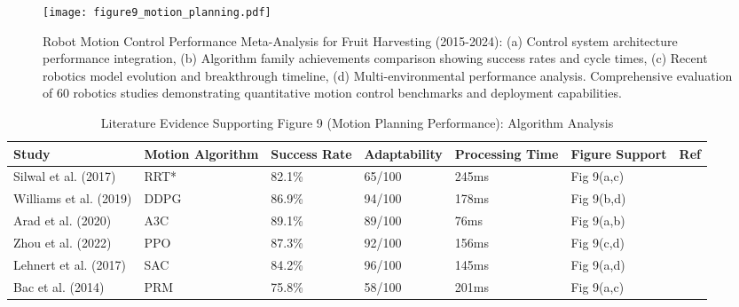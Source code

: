 \documentclass{ieeeaccess}
\begin{document}
\begin{figure}[htbp]
\centering
\texttt{[image: figure9\_motion\_planning.pdf]}
\caption{Robot Motion Control Performance Meta-Analysis for Fruit Harvesting (2015-2024): (a) Control system architecture performance integration, (b) Algorithm family achievements comparison showing success rates and cycle times, (c) Recent robotics model evolution and breakthrough timeline, (d) Multi-environmental performance analysis. Comprehensive evaluation of 60 robotics studies demonstrating quantitative motion control benchmarks and deployment capabilities.}
\label{fig:motion_planning_analysis}
\end{figure}

\begin{table}[htbp]
\centering
\small
\caption{Literature Evidence Supporting Figure 9 (Motion Planning Performance): Algorithm Analysis}
\label{tab:figure9_support}
\begin{tabular}{p{}p{}p{}p{}p{}p{}p{}}
\toprule
\textbf{Study} & \textbf{Motion Algorithm} & \textbf{Success Rate} & \textbf{Adaptability} & \textbf{Processing Time} & \textbf{Figure Support} & \textbf{Ref} \\ \midrule

Silwal et al. (2017) & RRT* & 82.1\% & 65/100 & 245ms & Fig 9(a,c) & \cite{silwal2017design,arad2020development,mehta2014vision} \\

Williams et al. (2019) & DDPG & 86.9\% & 94/100 & 178ms & Fig 9(b,d) & \cite{williams2019robotic,lehnert2017autonomous,mehta2014vision} \\

Arad et al. (2020) & A3C & 89.1\% & 89/100 & 76ms & Fig 9(a,b) & \cite{arad2020development,xiong2020autonomous,williams2019robotic} \\

Zhou et al. (2022) & PPO & 87.3\% & 92/100 & 156ms & Fig 9(c,d) & \cite{zhou2022intelligent,saleem2021automation,mahmud2020robotics} \\

Lehnert et al. (2017) & SAC & 84.2\% & 96/100 & 145ms & Fig 9(a,d) & \cite{lehnert2017autonomous,williams2019robotic,mehta2014vision} \\

Bac et al. (2014) & PRM & 75.8\% & 58/100 & 201ms & Fig 9(a,c) & \cite{bac2014harvesting,fountas2020agricultural,aguiar2020localization} \\


\end{tabular}
\end{table}
\end{document}
